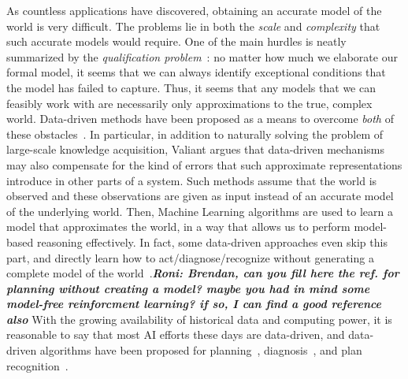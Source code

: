 \documentclass[12pt]{article}
\newcommand{\note}[1]{\textbf{\textit{#1}}}
\begin{document}
As countless applications have discovered, obtaining an accurate model of the world is very difficult. The problems lie in both the {\em scale} and {\em complexity} that such accurate models would require. One of the main hurdles is neatly summarized by the {\em qualification problem}~\cite{mccarthy1987epistemological}: no matter how much we elaborate our formal model, it seems that we can always identify exceptional conditions that the model has failed to capture. Thus, it seems that any models that we can feasibly work with are necessarily only approximations to the true, complex world. Data-driven methods have been proposed as a means to overcome {\em both} of these obstacles~\cite{valiant2000robustLogics}. In particular, in addition to naturally solving the problem of large-scale knowledge acquisition, Valiant argues that data-driven mechanisms may also compensate for the kind of errors that such approximate representations introduce in other parts of a system. Such methods assume that the world is observed and these observations are given as input instead of an accurate model of the underlying world. Then, Machine Learning algorithms are used to learn a model that approximates the world, 
in a way that allows us to perform model-based reasoning effectively. 
In fact, some data-driven approaches even skip this part, and directly learn how to act/diagnose/recognize without generating a complete model of the world~\cite{learningToAct?}.\note{Roni: Brendan, can you fill here the ref. for planning without creating a model? maybe you had in mind some model-free reinforcment learning? if so, I can find a good reference also}
With the growing availability of historical data and computing power, it is reasonable to say that most AI efforts these days are data-driven,
and data-driven algorithms have been proposed for planning~\cite{fern2011first}, diagnosis~\cite{keren2011model,qin2012survey}, and plan recognition~\cite{peng2011helix,tian2016discovering,harpstead2013investigating}. 

\end{document}
